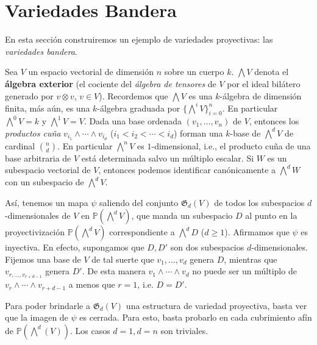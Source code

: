 \documentclass[spanish,10pt]{amsart}
\theoremstyle{definition}
\theoremstyle{remark}
\numberwithin{equation}{section}
\begin{document}
\section{Variedades Bandera}

En esta sección construiremos un ejemplo de variedades proyectivas: las \textit{variedades bandera}.

Sea $V$ un espacio vectorial de dimensión $n$ sobre un cuerpo $k$. $\bigwedge V$ denota el \textbf{álgebra exterior} (el cociente del \textit{álgebra de tensores} de $V$ por el ideal bilátero generado por $v \otimes v$, $v \in V$). Recordemos que $\bigwedge V$ es una $k$-álgebra de dimensión finita, más aún, es una $k$-álgebra graduada por $\{\bigwedge^i V\}_{i = 0}^n$. En particular $\bigwedge^0 V = k$ y $\bigwedge^1 V = V$. Dada una base ordenada $(v_1, \ldots, v_n)$ de $V$, entonces los \textit{productos cuña} $v_{i_1} \wedge \cdots \wedge v_{i_d}$ ($i_1 < i_2 < \cdots < i_d$) forman una $k$-base de $\bigwedge^d V$ de cardinal $\binom n d$. En particular $\bigwedge^n V$ es $1$-dimensional, i.e., el producto cuña de una base arbitraria de $V$ está determinada salvo un múltiplo escalar. Si $W$ es un subespacio vectorial de $V$, entonces podemos identificar canónicamente a $\bigwedge^d W$ con un subespacio de $\bigwedge^d V$.

Así, tenemos un mapa $\psi$ saliendo del conjunto $\mathfrak G_d (V)$ de todos los subespacios $d$-dimensionales de $V$ en $\mathbb{P} (\bigwedge^d V)$, que manda un subespacio $D$ al punto en la proyectivización $\mathbb{P} (\bigwedge^d V)$ correspondiente a $\bigwedge^d D$ ($d \geq 1$). Afirmamos que $\psi$ es inyectiva. En efecto, supongamos que $D,D'$ son dos subespacios $d$-dimensionales. Fijemos una base de $V$ de tal suerte que $v_1, \ldots, v_d$ genera $D$, mientras que $v_{r, \ldots, v_{r + d - 1}}$ genera $D'$. De esta manera $v_1 \wedge \cdots \wedge v_d$ no puede ser un múltiplo de $v_r \wedge \cdots \wedge v_{r+d - 1}$ a menos que $r = 1$, i.e. $D = D'$.

Para poder brindarle a $\mathfrak G _d (V)$ una estructura de variedad proyectiva, basta ver que la imagen de $\psi$ es cerrada. Para esto, basta probarlo en cada cubrimiento afín de $\mathbb{P}(\bigwedge^d (V))$. Los casos $d = 1, d = n$ son triviales.
\end{document}
